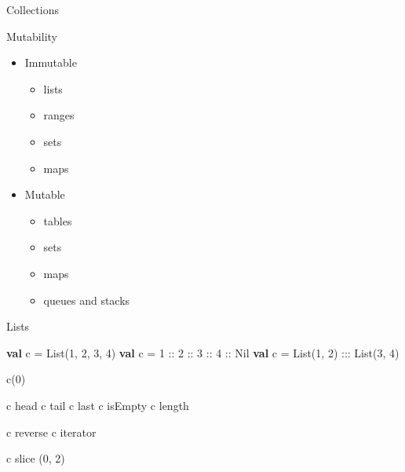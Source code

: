 \documentclass[ignorenonframetext,]{beamer}
\newenvironment{Shaded}{\begin{snugshade}}{\end{snugshade}}
\newcommand{\KeywordTok}[1]{\textcolor[rgb]{0.13,0.29,0.53}{\textbf{#1}}}
\newcommand{\DecValTok}[1]{\textcolor[rgb]{0.00,0.00,0.81}{#1}}
\newcommand{\FunctionTok}[1]{\textcolor[rgb]{0.00,0.00,0.00}{#1}}
\newcommand{\NormalTok}[1]{#1}
\providecommand{\tightlist}{%
  \setlength{\itemsep}{0pt}\setlength{\parskip}{0pt}}
\begin{document}
\begin{frame}[fragile]{Collections}

\begin{block}{Mutability}

\begin{itemize}
\item
  Immutable

  \begin{itemize}
  \tightlist
  \item
    lists
  \item
    ranges
  \item
    sets
  \item
    maps
  \end{itemize}
\item
  Mutable

  \begin{itemize}
  \tightlist
  \item
    tables
  \item
    sets
  \item
    maps
  \item
    queues and stacks
  \end{itemize}
\end{itemize}

\end{block}

\begin{block}{Lists}

\begin{Shaded}
\begin{Highlighting}[]
\KeywordTok{val}\NormalTok{ c = List(}\DecValTok{1}\NormalTok{, }\DecValTok{2}\NormalTok{, }\DecValTok{3}\NormalTok{, }\DecValTok{4}\NormalTok{)}
\KeywordTok{val}\NormalTok{ c = }\DecValTok{1}\NormalTok{ :: }\DecValTok{2}\NormalTok{ :: }\DecValTok{3}\NormalTok{ :: }\DecValTok{4}\NormalTok{ :: Nil}
\KeywordTok{val}\NormalTok{ c = List(}\DecValTok{1}\NormalTok{, }\DecValTok{2}\NormalTok{) ::: List(}\DecValTok{3}\NormalTok{, }\DecValTok{4}\NormalTok{)}

\FunctionTok{c}\NormalTok{(}\DecValTok{0}\NormalTok{)}

\NormalTok{c head}
\NormalTok{c tail}
\NormalTok{c last}
\NormalTok{c isEmpty}
\NormalTok{c length}

\NormalTok{c reverse}
\NormalTok{c iterator}

\NormalTok{c }\FunctionTok{slice}\NormalTok{ (}\DecValTok{0}\NormalTok{, }\DecValTok{2}\NormalTok{)}
\end{Highlighting}
\end{Shaded}


\end{block}
\end{frame}
\end{document}
